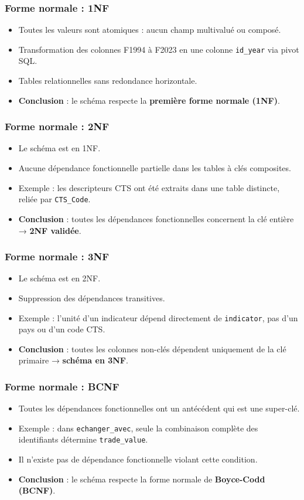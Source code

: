 \documentclass[11pt]{beamer}
\begin{document}
\begin{frame}
  \frametitle{Forme normale : 1NF}
  \begin{itemize}
    \item Toutes les valeurs sont atomiques : aucun champ multivalué ou composé.
    \item Transformation des colonnes F1994 à F2023 en une colonne \texttt{id\_year} via pivot SQL.
    \item Tables relationnelles sans redondance horizontale.
    \item \textbf{Conclusion} : le schéma respecte la \textbf{première forme normale (1NF)}.
  \end{itemize}
\end{frame}

\begin{frame}
  \frametitle{Forme normale : 2NF}
  \begin{itemize}
    \item Le schéma est en 1NF.
    \item Aucune dépendance fonctionnelle partielle dans les tables à clés composites.
    \item Exemple : les descripteurs CTS ont été extraits dans une table distincte, reliée par \texttt{CTS\_Code}.
    \item \textbf{Conclusion} : toutes les dépendances fonctionnelles concernent la clé entière → \textbf{2NF validée}.
  \end{itemize}
\end{frame}

\begin{frame}
  \frametitle{Forme normale : 3NF}
  \begin{itemize}
    \item Le schéma est en 2NF.
    \item Suppression des dépendances transitives.
    \item Exemple : l’unité d’un indicateur dépend directement de \texttt{indicator}, pas d’un pays ou d’un code CTS.
    \item \textbf{Conclusion} : toutes les colonnes non-clés dépendent uniquement de la clé primaire → \textbf{schéma en 3NF}.
  \end{itemize}
\end{frame}

\begin{frame}
  \frametitle{Forme normale : BCNF}
  \begin{itemize}
    \item Toutes les dépendances fonctionnelles ont un antécédent qui est une super-clé.
    \item Exemple : dans \texttt{echanger\_avec}, seule la combinaison complète des identifiants détermine \texttt{trade\_value}.
    \item Il n'existe pas de dépendance fonctionnelle violant cette condition.
    \item \textbf{Conclusion} : le schéma respecte la forme normale de \textbf{Boyce-Codd (BCNF)}.
  \end{itemize}
\end{frame}
\end{document}
